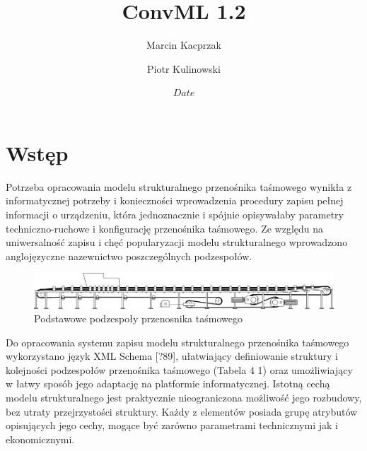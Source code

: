 \documentclass[12pt,a4paper]{report}
\title{ConvML 1.2}
\author{Marcin Kacprzak \and Piotr Kulinowski}
\date{$Date$}
\begin{document}
\maketitle
\tableofcontents

\section{Wstęp}
Potrzeba opracowania modelu strukturalnego przenośnika taśmowego wynikła z
informatycznej potrzeby i konieczności wprowadzenia procedury zapisu pełnej
informacji o urządzeniu, która jednoznacznie i spójnie opisywałaby parametry
techniczno-ruchowe i konfigurację przenośnika taśmowego.  Ze względu na
uniwersalność zapisu i chęć popularyzacji modelu strukturalnego wprowadzono
anglojęzyczne nazewnictwo poszczególnych podzespołów.

\begin{figure}
\centering
\includegraphics[width=\textwidth]{png/przenosnik}
\caption{Podstawowe podzespoły przenosnika taśmowego}
\label{fig:przenosnik}
\end{figure}

Do opracowania systemu zapisu modelu strukturalnego przenośnika taśmowego
wykorzystano język XML Schema [?89], ułatwiający definiowanie struktury i
kolejności podzespołów przenośnika taśmowego (Tabela 4 1) oraz umożliwiający w
łatwy sposób jego adaptację na platformie informatycznej.  Istotną cechą modelu
strukturalnego jest praktycznie nieograniczona możliwość jego rozbudowy, bez
utraty przejrzystości struktury.  Każdy z elementów posiada grupę atrybutów
opisujących jego cechy, mogące być zarówno parametrami technicznymi jak i
ekonomicznymi.
\end{document}
